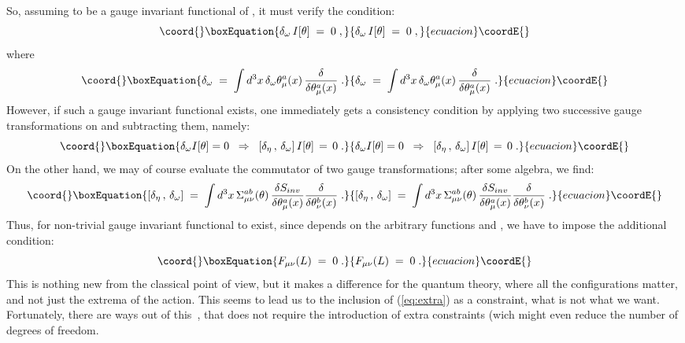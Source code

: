 \documentclass[a4paper,12pt]{article}
\begin{document}
So, assuming \coordHE{} to be a gauge invariant
functional of \myHighlight{$\theta$}\coordHE{}, it must verify the condition:
\begin{equation}\coord{}\boxEquation{\label{eq:ginvi}
\delta_\omega \, I[\theta] \;=\; 0 \;,
}{\delta_\omega \, I[\theta] \;=\; 0 \;,
}{ecuacion}\coordE{}\end{equation}
where 
\begin{equation}\coord{}\boxEquation{
\delta_\omega \;=\; \int d^3x \, \delta_\omega \theta_\mu^a(x) \, 
\frac{\delta}{\delta \theta_\mu^a(x)} \;.
}{
\delta_\omega \;=\; \int d^3x \, \delta_\omega \theta_\mu^a(x) \, 
\frac{\delta}{\delta \theta_\mu^a(x)} \;.
}{ecuacion}\coordE{}\end{equation}
However, if such a gauge invariant functional exists, one immediately
gets a consistency condition by applying two successive gauge
transformations on \coordHE{} and subtracting them, namely:
\begin{equation}\coord{}\boxEquation{\label{eq:ccond}
\delta_\omega I[\theta]=0 \;\;\Rightarrow \;\; 
\left[ \delta_\eta \,,\, \delta_\omega \right] I[\theta] \,=\, 0 \;.
}{\delta_\omega I[\theta]=0 \;\;\Rightarrow \;\; 
\left[ \delta_\eta \,,\, \delta_\omega \right] I[\theta] \,=\, 0 \;.
}{ecuacion}\coordE{}\end{equation}
On the other hand, we may of course evaluate the commutator of two
gauge transformations; after some algebra, we find:
\begin{equation}\coord{}\boxEquation{\label{eq:comm}
[ \delta_\eta \,,\, \delta_\omega ] \;=\; \int d^3x \,
\Sigma_{\mu\nu}^{ab}(\theta) \, \frac{\delta S_{inv}}{\delta
  \theta_\mu^a (x)}  \frac{\delta }{\delta\theta_\nu^b (x)}  \;.
}{[ \delta_\eta \,,\, \delta_\omega ] \;=\; \int d^3x \,
\Sigma_{\mu\nu}^{ab}(\theta) \, \frac{\delta S_{inv}}{\delta
  \theta_\mu^a (x)}  \frac{\delta }{\delta\theta_\nu^b (x)}  \;.
}{ecuacion}\coordE{}\end{equation}
Thus, for non-trivial gauge invariant functional \coordHE{} to exist, since
\myHighlight{$\Sigma$}\coordHE{} depends on the arbitrary functions \myHighlight{$\eta$}\coordHE{} and \myHighlight{$\omega$}\coordHE{}, we
have to impose the additional condition:
\begin{equation}\coord{}\boxEquation{\label{eq:extra}
F_{\mu\nu}(L) \;=\; 0\;.
}{F_{\mu\nu}(L) \;=\; 0\;.
}{ecuacion}\coordE{}\end{equation}
This is nothing new from the classical point of view, but it makes a
difference for the quantum theory, where all the configurations
matter, and not just the extrema of the action. This seems to lead us
to the inclusion of (\ref{eq:extra}) as a constraint, what is not what
we want. Fortunately, there are ways out of this~\cite{teit}, that
does not require the introduction of  extra constraints (wich might
even reduce the number of degrees of freedom. 
\end{document}
